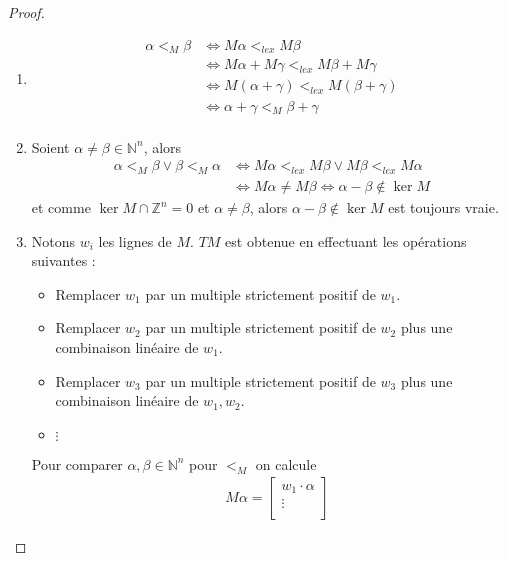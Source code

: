         \begin{proof}
            \begin{enumerate}
                \item
                \begin{align*}
                    \alpha <_M \beta &\iff M \alpha <_{lex} M \beta \\
                    &\iff M \alpha + M \gamma <_{lex} M \beta + M \gamma \\
                    &\iff M(\alpha + \gamma) <_{lex} M(\beta + \gamma) \\
                    &\iff \alpha + \gamma <_M \beta + \gamma \\ 
                \end{align*}
                \item Soient $\alpha \neq \beta \in \mathbb{N}^n$, alors
                \begin{align*}
                    \alpha <_M \beta \lor \beta <_M \alpha &\iff M \alpha <_{lex} M \beta \lor M \beta <_{lex} M \alpha \\
                    &\iff M \alpha \neq M \beta \iff \alpha - \beta \notin \ker M
                \end{align*}
                et comme $\ker M \cap \mathbb{Z}^n = 0$ et $\alpha \neq \beta$, alors $\alpha - \beta \notin \ker M$ est toujours vraie.
                \item Notons $w_i$ les lignes de $M$. $TM$ est obtenue en effectuant les opérations suivantes :
                \begin{itemize}
                    \item Remplacer $w_1$ par un multiple strictement positif de $w_1$.
                    \item Remplacer $w_2$ par un multiple strictement positif de $w_2$ plus une combinaison linéaire de $w_1$.
                    \item Remplacer $w_3$ par un multiple strictement positif de $w_3$ plus une combinaison linéaire de $w_1, w_2$.
                    \item $\vdots$
                \end{itemize}
                Pour comparer $\alpha, \beta \in \mathbb{N}^n$ pour $<_M$ on calcule
                \begin{align*}
                    &M \alpha =
                    \begin{bmatrix}
                        w_1 \cdot \alpha \\
                        \vdots \\

\end{bmatrix}
\end{align*}
\end{enumerate}
\end{proof}
